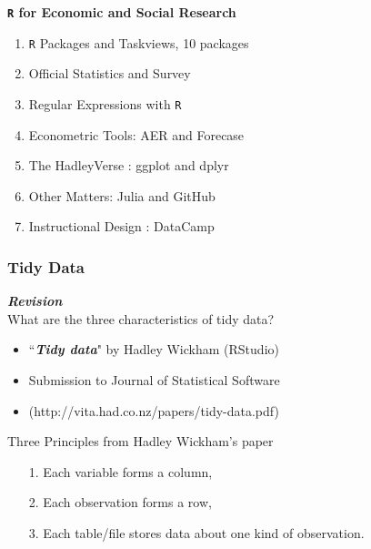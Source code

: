 \documentclass{beamer}
\begin{document}
\begin{frame}
\textbf{\texttt{R} for Economic and Social Research}
\begin{enumerate}
\item \texttt{R} Packages and Taskviews, 10 packages
\item Official Statistics and Survey 
\item Regular Expressions with \texttt{R}
\item Econometric Tools: AER and Forecase
\item The HadleyVerse : ggplot and dplyr
\item Other Matters:  Julia and GitHub
\item Instructional Design : DataCamp
\end{enumerate}
\end{frame}
\begin{frame}
\frametitle{Tidy Data}
\textbf{\textit{Revision}}\\
What are the three characteristics of tidy data?

\begin{itemize}
	\item ``\textit{\textbf{Tidy data}}" by Hadley Wickham (RStudio)
	\item Submission to Journal of Statistical Software
	\item (http://vita.had.co.nz/papers/tidy-data.pdf)
\end{itemize}

\end{frame}
\begin{frame}

Three Principles from Hadley Wickham's paper
\begin{itemize}
	\item[1.] Each variable forms a column, 
	\item[2.] Each observation forms a row, 
	\item[3.] Each table/file stores data about one kind of observation.
\end{itemize}
\end{frame}
\end{document}
